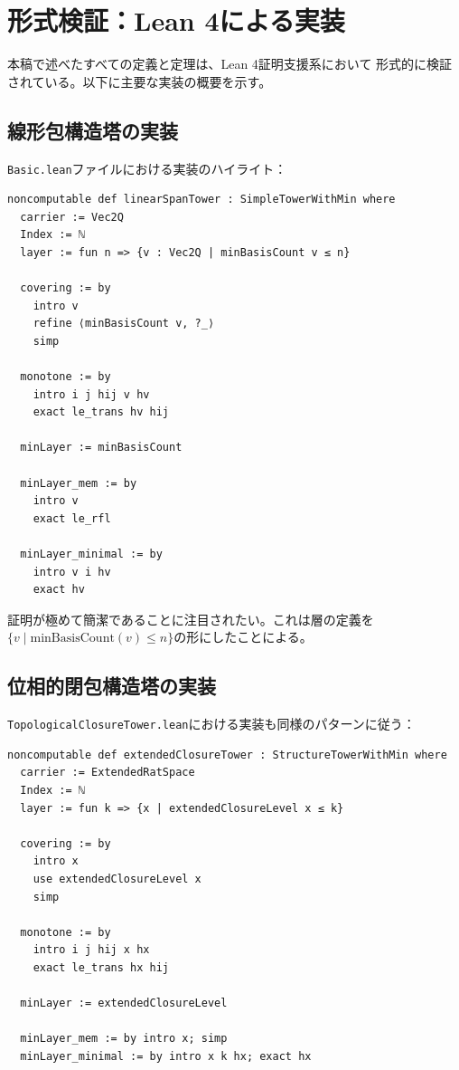 \documentclass[a4paper,12pt]{ltjsarticle}
\theoremstyle{definition}
\begin{document}
\section{形式検証：Lean 4による実装}

本稿で述べたすべての定義と定理は、Lean 4証明支援系において
形式的に検証されている。以下に主要な実装の概要を示す。

\subsection{線形包構造塔の実装}

\texttt{Basic.lean}ファイルにおける実装のハイライト：

\begin{verbatim}
noncomputable def linearSpanTower : SimpleTowerWithMin where
  carrier := Vec2Q
  Index := ℕ
  layer := fun n => {v : Vec2Q | minBasisCount v ≤ n}

  covering := by
    intro v
    refine ⟨minBasisCount v, ?_⟩
    simp

  monotone := by
    intro i j hij v hv
    exact le_trans hv hij

  minLayer := minBasisCount

  minLayer_mem := by
    intro v
    exact le_rfl

  minLayer_minimal := by
    intro v i hv
    exact hv
\end{verbatim}

証明が極めて簡潔であることに注目されたい。これは層の定義を
$\{v \mid \mathrm{minBasisCount}(v) \leq n\}$の形にしたことによる。

\subsection{位相的閉包構造塔の実装}

\texttt{TopologicalClosureTower.lean}における実装も同様のパターンに従う：

\begin{verbatim}
noncomputable def extendedClosureTower : StructureTowerWithMin where
  carrier := ExtendedRatSpace
  Index := ℕ
  layer := fun k => {x | extendedClosureLevel x ≤ k}

  covering := by
    intro x
    use extendedClosureLevel x
    simp

  monotone := by
    intro i j hij x hx
    exact le_trans hx hij

  minLayer := extendedClosureLevel

  minLayer_mem := by intro x; simp
  minLayer_minimal := by intro x k hx; exact hx
\end{verbatim}
\end{document}
